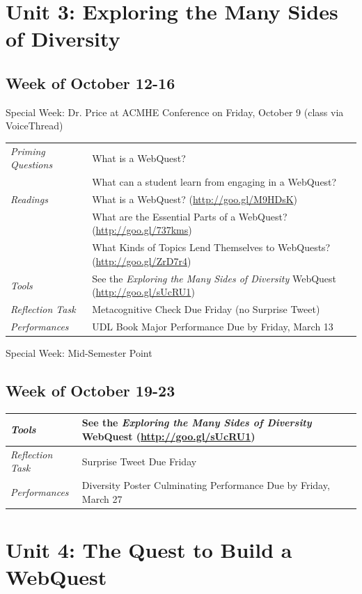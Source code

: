 \documentclass{tufte-handout}
\newcommand{\tabpq}{\faQuestionSign\medspace\textit{Priming Questions}}
\newcommand{\tabread}{\faBook\medspace\textit{Readings}}
\newcommand{\tabtools}{\faWrench\medspace\textit{Tools}}
\newcommand{\tabtweet}{\faLightbulb\medspace\textit{Reflection Task} & Surprise Tweet Due Friday \\}
\newcommand{\tabcheck}{\faLightbulb\medspace\textit{Reflection Task} & Metacognitive Check Due Friday (no Surprise Tweet) \\}
\newcommand{\tabperformance}{\faTasks\medspace\textit{Performances}}
\newenvironment{tabsched}
	{\small
	\begin{tabular}{p{1.5in}p{4.5in}}
	\toprule}
	{\bottomrule
	\end{tabular}
	\normalsize}
\newenvironment{specweek}
	{\begin{center}
		\fontseries{b} \faBullhorn \medspace Special Week: }
		{\medspace \faBullhorn \fontseries{m}
	\end{center}}
\newcommand{\weeknine}{October 12-16}
\newcommand{\weekten}{October 19-23}
\newcommand{\midsemester}{Mid-Semester Point}
\newcommand{\acmhe}{Dr. Price at ACMHE Conference on Friday, October 9 (class via VoiceThread)}
\begin{document}
\section{Unit 3: Exploring the Many Sides of Diversity}

\subsection{Week of \weeknine}

\begin{specweek}\acmhe\end{specweek}

\begin{tabsched}
	\tabpq & What is a WebQuest? \\
	& What can a student learn from engaging in a WebQuest? \\
	\midrule
	\tabread &  What is a WebQuest? (\url{http://goo.gl/M9HDsK}) \\
	& What are the Essential Parts of a WebQuest? (\url{http://goo.gl/737kms}) \\
	& What Kinds of Topics Lend Themselves to WebQuests? (\url{http://goo.gl/ZrD7r4}) \\
	\midrule
	\tabtools & See the \textit{Exploring the Many Sides of Diversity} WebQuest (\url{http://goo.gl/sUcRU1}) \\
	\midrule
	\tabcheck
	\midrule
	\tabperformance & UDL Book Major Performance Due by Friday, March 13 \\
\end{tabsched}

\begin{specweek}\midsemester\end{specweek}

\subsection{Week of \weekten}

\begin{tabsched}
	\tabtools & See the \textit{Exploring the Many Sides of Diversity} WebQuest (\url{http://goo.gl/sUcRU1}) \\
	\midrule
	\tabtweet
	\midrule
	\tabperformance & Diversity Poster Culminating Performance Due by Friday, March 27 \\
\end{tabsched}

\section{Unit 4: The Quest to Build a WebQuest}
\end{document}
